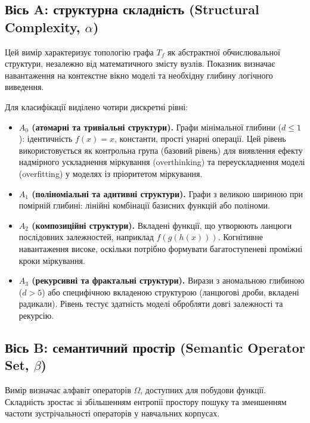 \documentclass[11pt]{article}
\begin{document}
\subsection{Вісь A: структурна складність (Structural Complexity, \texorpdfstring{$\alpha$}{alpha})}

Цей вимір характеризує топологію графа $T_f$ як абстрактної обчислювальної структури, незалежно від математичного змісту вузлів. Показник визначає навантаження на контекстне вікно моделі та необхідну глибину логічного виведення.

Для класифікації виділено чотири дискретні рівні:

\begin{itemize}[leftmargin=1.5em]
  \item \textbf{$A_0$ (атомарні та тривіальні структури).} Графи мінімальної глибини ($d\leq 1$): ідентичність $f(x)=x$, константи, прості унарні операції. Цей рівень використовується як контрольна група (базовий рівень) для виявлення ефекту надмірного ускладнення міркування (overthinking) та переускладнення моделі (overfitting) у моделях із пріоритетом міркування.
  \item \textbf{$A_1$ (поліноміальні та адитивні структури).} Графи з великою шириною при помірній глибині: лінійні комбінації базисних функцій або поліноми.
  \item \textbf{$A_2$ (композиційні структури).} Вкладені функції, що утворюють ланцюги послідовних залежностей, наприклад $f(g(h(x)))$. Когнітивне навантаження високе, оскільки потрібно формувати багатоступеневі проміжні кроки міркування.
  \item \textbf{$A_3$ (рекурсивні та фрактальні структури).} Вирази з аномальною глибиною ($d>5$) або специфічною вкладеною структурою (ланцюгові дроби, вкладені радикали). Рівень тестує здатність моделі обробляти довгі залежності та рекурсію.
\end{itemize}

\subsection{Вісь B: семантичний простір (Semantic Operator Set, \texorpdfstring{$\beta$}{beta})}

Вимір визначає алфавіт операторів $\Omega$, доступних для побудови функції. Складність зростає зі збільшенням ентропії простору пошуку та зменшенням частоти зустрічальності операторів у навчальних корпусах.
\end{document}
